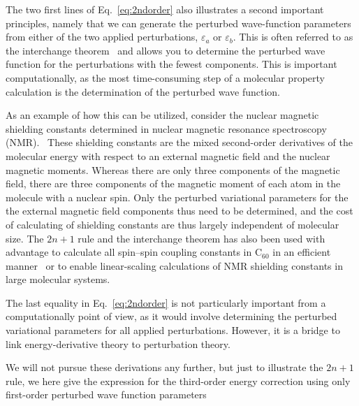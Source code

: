 \documentclass[%
 reprint,
 amsmath,amssymb,
 aps,
]{revtex4-1}
\begin{document}
The two first lines of Eq.~\eqref{eq:2ndorder} also illustrates a
second important principles, namely that we can generate the perturbed
wave-function parameters from either of the two applied perturbations,
$\varepsilon_a$ or $\varepsilon_b$. This is often referred to as the
interchange theorem~\cite{Interchange} and allows you to determine the
perturbed wave function for the perturbations with the fewest
components. This is important computationally, as the most
time-consuming step of a molecular property calculation is the
determination of the perturbed wave function.

As an example of how this can be utilized, consider the nuclear
magnetic shielding constants determined in nuclear magnetic resonance
spectroscopy (NMR).~\cite{ChemRev1999,ChemRev2012} These shielding constants are the mixed
second-order derivatives of the molecular energy with respect to an
external magnetic field and the nuclear magnetic moments. Whereas
there are only three components of the magnetic field, there are three
components of the magnetic moment of each atom in the molecule with a
nuclear spin. Only the perturbed variational parameters for the the external
magnetic field components thus need to be determined, and the cost of 
calculating of shielding constants are thus largely independent of
molecular size. The $2n+1$ rule and the interchange theorem has also
been used with advantage to calculate all spin--spin coupling
constants in C$_{60}$ in an efficient manner~\cite{JaszunskiC60} or to
enable linear-scaling calculations of NMR shielding constants in large
molecular systems.~\cite{Ochsenfeld}

The last equality in Eq.~\eqref{eq:2ndorder} is not particularly
important from a computationally point of view, as it would involve
determining the perturbed variational parameters for all applied
perturbations. However, it is a bridge to link energy-derivative
theory to perturbation theory.

We will not pursue these derivations any further, but just to
illustrate the $2n+1$ rule, we here give the expression for the
third-order energy correction using only first-order perturbed wave
function parameters
\end{document}
